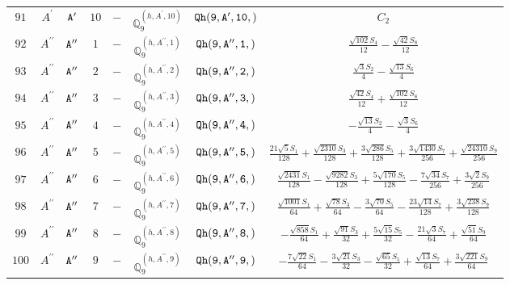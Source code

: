 \documentclass[fleqn,8pt]{jsarticle}
\begin{document}
\begin{table}[ht!]
\begin{center}
\begin{tabular}{cccccccc}
$ 91 $ & $ A^{\prime} $ & $ {\tt A'} $ & $ 10 $ & $ - $ & $ \mathbb{Q}_{9}^{(h,A^{\prime},10)} $ & $ {\tt Qh(9,A',10,)} $ & $ C_{2} $ \\
$ 92 $ & $ A^{\prime\prime} $ & $ {\tt A''} $ & $ 1 $ & $ - $ & $ \mathbb{Q}_{9}^{(h,A^{\prime\prime},1)} $ & $ {\tt Qh(9,A'',1,)} $ & $ \frac{\sqrt{102} S_{4}}{12} - \frac{\sqrt{42} S_{8}}{12} $ \\
$ 93 $ & $ A^{\prime\prime} $ & $ {\tt A''} $ & $ 2 $ & $ - $ & $ \mathbb{Q}_{9}^{(h,A^{\prime\prime},2)} $ & $ {\tt Qh(9,A'',2,)} $ & $ \frac{\sqrt{3} S_{2}}{4} - \frac{\sqrt{13} S_{6}}{4} $ \\
$ 94 $ & $ A^{\prime\prime} $ & $ {\tt A''} $ & $ 3 $ & $ - $ & $ \mathbb{Q}_{9}^{(h,A^{\prime\prime},3)} $ & $ {\tt Qh(9,A'',3,)} $ & $ \frac{\sqrt{42} S_{4}}{12} + \frac{\sqrt{102} S_{8}}{12} $ \\
$ 95 $ & $ A^{\prime\prime} $ & $ {\tt A''} $ & $ 4 $ & $ - $ & $ \mathbb{Q}_{9}^{(h,A^{\prime\prime},4)} $ & $ {\tt Qh(9,A'',4,)} $ & $ - \frac{\sqrt{13} S_{2}}{4} - \frac{\sqrt{3} S_{6}}{4} $ \\
$ 96 $ & $ A^{\prime\prime} $ & $ {\tt A''} $ & $ 5 $ & $ - $ & $ \mathbb{Q}_{9}^{(h,A^{\prime\prime},5)} $ & $ {\tt Qh(9,A'',5,)} $ & $ \frac{21 \sqrt{5} S_{1}}{128} + \frac{\sqrt{2310} S_{3}}{128} + \frac{3 \sqrt{286} S_{5}}{128} + \frac{3 \sqrt{1430} S_{7}}{256} + \frac{\sqrt{24310} S_{9}}{256} $ \\
$ 97 $ & $ A^{\prime\prime} $ & $ {\tt A''} $ & $ 6 $ & $ - $ & $ \mathbb{Q}_{9}^{(h,A^{\prime\prime},6)} $ & $ {\tt Qh(9,A'',6,)} $ & $ \frac{\sqrt{2431} S_{1}}{128} - \frac{\sqrt{9282} S_{3}}{128} + \frac{5 \sqrt{170} S_{5}}{128} - \frac{7 \sqrt{34} S_{7}}{256} + \frac{3 \sqrt{2} S_{9}}{256} $ \\
$ 98 $ & $ A^{\prime\prime} $ & $ {\tt A''} $ & $ 7 $ & $ - $ & $ \mathbb{Q}_{9}^{(h,A^{\prime\prime},7)} $ & $ {\tt Qh(9,A'',7,)} $ & $ \frac{\sqrt{1001} S_{1}}{64} + \frac{\sqrt{78} S_{3}}{64} - \frac{3 \sqrt{70} S_{5}}{64} - \frac{23 \sqrt{14} S_{7}}{128} + \frac{3 \sqrt{238} S_{9}}{128} $ \\
$ 99 $ & $ A^{\prime\prime} $ & $ {\tt A''} $ & $ 8 $ & $ - $ & $ \mathbb{Q}_{9}^{(h,A^{\prime\prime},8)} $ & $ {\tt Qh(9,A'',8,)} $ & $ - \frac{\sqrt{858} S_{1}}{64} + \frac{\sqrt{91} S_{3}}{32} + \frac{5 \sqrt{15} S_{5}}{32} - \frac{21 \sqrt{3} S_{7}}{64} + \frac{\sqrt{51} S_{9}}{64} $ \\
$ 100 $ & $ A^{\prime\prime} $ & $ {\tt A''} $ & $ 9 $ & $ - $ & $ \mathbb{Q}_{9}^{(h,A^{\prime\prime},9)} $ & $ {\tt Qh(9,A'',9,)} $ & $ - \frac{7 \sqrt{22} S_{1}}{64} - \frac{3 \sqrt{21} S_{3}}{32} - \frac{\sqrt{65} S_{5}}{32} + \frac{\sqrt{13} S_{7}}{64} + \frac{3 \sqrt{221} S_{9}}{64} $ \\
 \hline \hline
\end{tabular}
\end{center}
\end{table}
\end{document}
